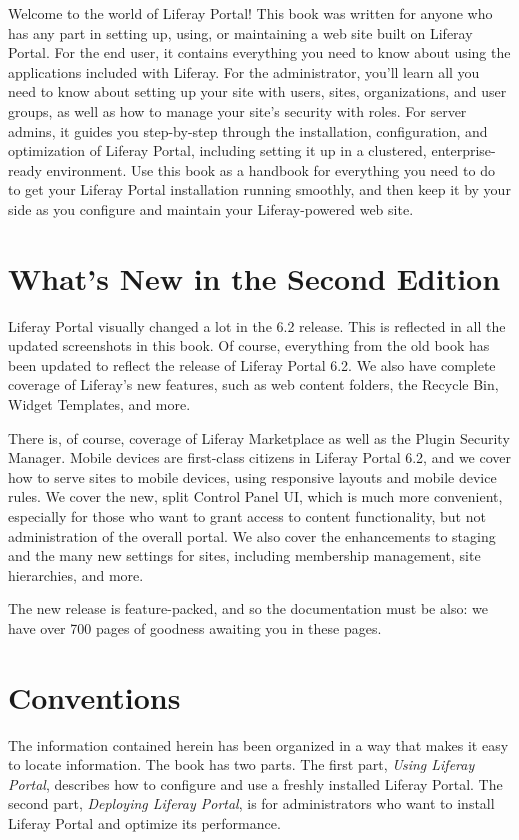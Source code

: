 \documentclass[9pt,openright,twoside]{memoir}
\begin{document}
Welcome to the world of Liferay Portal! This book was written for anyone who has
any part in setting up, using, or maintaining a web site built on Liferay
Portal. For the end user, it contains everything you need to know about using
the applications included with Liferay. For the administrator, you'll learn all
you need to know about setting up your site with users, sites, organizations,
and user groups, as well as how to manage your site's security with roles. For
server admins, it guides you step-by-step through the installation,
configuration, and optimization of Liferay Portal, including setting it up in a
clustered, enterprise-ready environment. Use this book as a handbook for
everything you need to do to get your Liferay Portal installation running
smoothly, and then keep it by your side as you configure and maintain your
Liferay-powered web site.

\section{What's New in the Second Edition}

Liferay Portal visually changed a lot in the 6.2 release. This is reflected in 
all the updated screenshots in this book. Of course, everything from the old
book has been updated to reflect the release of Liferay Portal 6.2. We also
have complete coverage of Liferay's new features, such as web content folders, 
the Recycle Bin, Widget Templates, and more. 

There is, of course, coverage of Liferay Marketplace as well as the Plugin
Security Manager. Mobile devices are first-class citizens in Liferay Portal 6.2, 
and we cover how to serve sites to mobile devices, using responsive layouts 
and mobile device rules. We cover the new, split Control Panel UI, which is 
much more convenient, especially for those who want to grant access to content 
functionality, but not administration of the overall portal. We also cover the 
enhancements to staging and the many new settings for sites, including 
membership management, site hierarchies, and more. 

The new release is feature-packed, and so the documentation must be also: we
have over 700 pages of goodness awaiting you in these pages. 

\section{Conventions}

The information contained herein has been organized in a way that makes it easy
to locate information. The book has two parts. The first part, 
\textit{Using Liferay Portal}, describes how to configure and use a freshly 
installed Liferay Portal. The second part, \textit{Deploying Liferay Portal}, 
is for administrators who want to install Liferay Portal and optimize its 
performance. 
\end{document}

